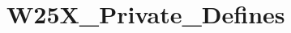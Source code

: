 \hypertarget{group___w25_x___private___defines}{}\section{W25\+X\+\_\+\+Private\+\_\+\+Defines}
\label{group___w25_x___private___defines}
